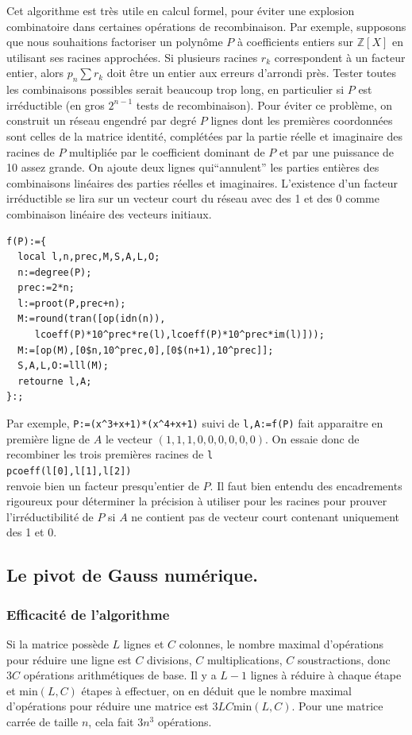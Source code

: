 \documentclass[a4paper,11pt]{article}
\newcommand{\Z}{{\mathbb{Z}}}
\begin{document}
Cet algorithme est tr\`es utile en calcul formel, pour \'eviter
une explosion combinatoire dans certaines
op\'erations de recombinaison. Par exemple, supposons que
nous souhaitions factoriser un polyn\^ome $P$ \`a coefficients
entiers sur $\Z[X]$ en utilisant ses racines approch\'ees. Si
plusieurs racines $r_k$ correspondent \`a un facteur entier,
alors $p_n \sum r_k $ doit \^etre un entier aux erreurs
d'arrondi pr\`es. Tester toutes les combinaisons possibles
serait beaucoup trop long, en particulier si $P$ est irr\'eductible
(en gros $2^{n-1}$ tests de recombinaison). Pour \'eviter ce
probl\`eme, on construit un r\'eseau engendr\'e par degr\'e $P$ 
lignes dont les premi\`eres coordonn\'ees sont celles de la
matrice identit\'e, compl\'et\'ees par la partie r\'eelle et
imaginaire des racines de $P$ multipli\'ee par le coefficient dominant
de $P$ et par une puissance de 10 assez grande. On ajoute
deux lignes qui``annulent'' les parties enti\`eres des combinaisons
lin\'eaires des parties r\'eelles et imaginaires.
L'existence
d'un facteur irr\'eductible se lira sur un vecteur court du r\'eseau
avec des 1 et des 0 comme combinaison lin\'eaire des vecteurs
initiaux.
\begin{verbatim}
f(P):={
  local l,n,prec,M,S,A,L,O;
  n:=degree(P);
  prec:=2*n;
  l:=proot(P,prec+n);
  M:=round(tran([op(idn(n)),
     lcoeff(P)*10^prec*re(l),lcoeff(P)*10^prec*im(l)]));
  M:=[op(M),[0$n,10^prec,0],[0$(n+1),10^prec]];
  S,A,L,O:=lll(M);
  retourne l,A;
}:;
\end{verbatim}
Par exemple, \verb|P:=(x^3+x+1)*(x^4+x+1)| suivi de \verb|l,A:=f(P)|
fait apparaitre en premi\`ere ligne de $A$ le vecteur
$(1,1,1,0,0,0,0,0,0)$. On essaie donc de recombiner les trois
premi\`eres racines de \verb|l|\\
\verb|pcoeff(l[0],l[1],l[2])|\\
renvoie bien un facteur presqu'entier de $P$. Il faut bien entendu des
encadrements rigoureux pour d\'eterminer la pr\'ecision \`a utiliser
pour les racines pour prouver l'irr\'eductibilit\'e de $P$ si $A$ ne
contient pas de vecteur court contenant uniquement des 1 et 0.

\subsection{Le pivot de Gauss num\'erique.}
\subsubsection{Efficacité de l'algorithme}
Si la matrice possède $L$ lignes et $C$ colonnes,
le nombre maximal d'opérations pour réduire une ligne est $C$ divisions,
$C$ multiplications, $C$ soustractions, donc $3C$ opérations
arithmétiques de base. Il y a $L-1$ lignes à réduire à chaque
étape et min$(L,C)$ étapes à effectuer, on en déduit que le
nombre maximal d'opérations pour réduire une matrice est
$3LC$min$(L,C)$. Pour une matrice carrée de taille $n$, cela fait 
$3n^3$ opérations.
\end{document}
